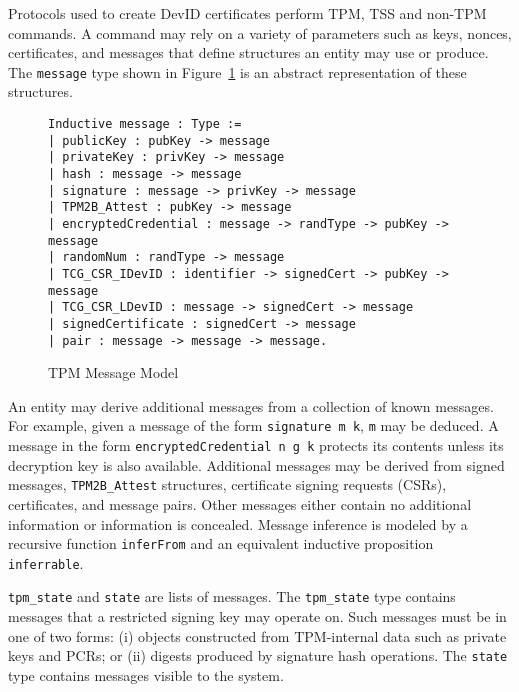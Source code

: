 \documentclass[runningheads]{llncs}
\begin{document}



Protocols used to create DevID certificates perform TPM, TSS and
non-TPM commands. A command may rely on a variety of parameters such
as keys, nonces, certificates, and messages that define structures an
entity may use or produce. The \verb|message| type shown in
Figure~\ref{fig:message-model} is an abstract representation of these
structures.

\begin{figure}[hbtp]
\begin{lstlisting}[language=Coq]
Inductive message : Type :=
| publicKey : pubKey -> message
| privateKey : privKey -> message
| hash : message -> message
| signature : message -> privKey -> message
| TPM2B_Attest : pubKey -> message
| encryptedCredential : message -> randType -> pubKey -> message
| randomNum : randType -> message
| TCG_CSR_IDevID : identifier -> signedCert -> pubKey -> message
| TCG_CSR_LDevID : message -> signedCert -> message
| signedCertificate : signedCert -> message
| pair : message -> message -> message.
\end{lstlisting}
\caption{TPM Message Model}
\label{fig:message-model}
\end{figure}

An entity may derive additional messages from a collection of known
messages.  For example, given a message of the form
\verb|signature m k|, \verb|m| may be deduced.  A message in the form
\verb|encryptedCredential n g k| protects its contents unless its
decryption key is also available.  Additional messages may be derived
from signed messages, \verb|TPM2B_Attest| structures, certificate
signing requests (CSRs), certificates, and message pairs. Other
messages either contain no additional information or information is
concealed.  Message inference is modeled by a
recursive function \verb|inferFrom| and an equivalent inductive
proposition \verb|inferrable|.

\verb|tpm_state| and \verb|state| are lists of messages. The
\verb|tpm_state| type contains messages that a restricted signing key
may operate on. Such messages must be in one of two forms: (i) objects
constructed from TPM-internal data such as private keys and PCRs; or
(ii) digests produced by signature hash operations.  The \verb|state|
type contains messages visible to the system.
\end{document}
